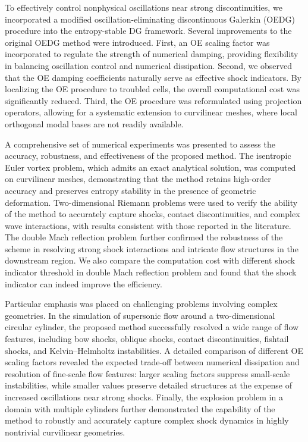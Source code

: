 \documentclass[fleqn,11pt]{amsart}
\begin{document}
{To effectively control nonphysical oscillations near strong
discontinuities, we incorporated a modified oscillation-eliminating discontinuous Galerkin (OEDG) procedure into the entropy-stable DG framework.
Several improvements to the original OEDG method were introduced.
First, an OE scaling factor was incorporated to regulate the strength of
numerical damping, providing flexibility in balancing oscillation control
and numerical dissipation.
Second, we observed that the OE damping coefficients naturally serve as
effective shock indicators.
By localizing the OE procedure to troubled cells, the overall computational
cost was significantly reduced.
Third, the OE procedure was reformulated using projection operators,
allowing for a systematic extension to curvilinear meshes, where local
orthogonal modal bases are not readily available.

A comprehensive set of numerical experiments was presented to assess the accuracy, robustness, and effectiveness of the proposed method.
The isentropic Euler vortex problem, which admits an exact analytical solution, was computed on curvilinear meshes, demonstrating that the method retains high-order accuracy and preserves entropy stability in the presence
of geometric deformation.
Two-dimensional Riemann problems were used to verify the ability of the method to accurately capture shocks, contact discontinuities, and complex wave interactions, with results consistent with those reported in the
literature.
The double Mach reflection problem further confirmed the robustness of the scheme in resolving strong shock interactions and intricate flow structures
in the downstream region. We also compare the computation cost with different shock indicator threshold in double Mach reflection problem and found that the shock indicator can indeed improve the efficiency.

Particular emphasis was placed on challenging problems involving complex geometries.
In the simulation of supersonic flow around a two-dimensional circular cylinder, the proposed method successfully resolved a wide range of
flow features, including bow shocks, oblique shocks, contact discontinuities, fishtail shocks, and Kelvin--Helmholtz instabilities.
A detailed comparison of different OE scaling factors revealed the expected trade-off between numerical dissipation and resolution of fine-scale flow
features: larger scaling factors suppress small-scale instabilities, while smaller values preserve detailed structures at the expense of increased oscillations near strong shocks.
Finally, the explosion problem in a domain with multiple cylinders further demonstrated the capability of the method to robustly and accurately capture complex shock dynamics in highly nontrivial curvilinear geometries.

}
\end{document}
